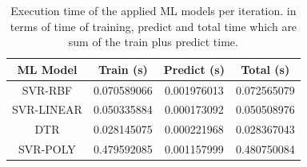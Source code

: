 \documentclass{bmcart}
\begin{document}
\begin{backmatter}
\begin{table}[h!]
\caption{Execution time of the applied ML models per iteration. in terms of time of training, predict and total time which are sum of the train plus predict time.}  \label{tab2}
\centering
\begin{tabular}{cccc}
\toprule
\textbf{ML Model} & \textbf{Train (s)} & \textbf{Predict (s)} & \textbf{Total (s)} \\
\midrule
SVR-RBF & 0.070589066 & 0.001976013 & 0.072565079 \\
SVR-LINEAR & 0.050335884 & 0.000173092 & 0.050508976 \\
DTR & 0.028145075 & 0.000221968 & 0.028367043 \\
SVR-POLY & 0.479592085 & 0.001157999 & 0.480750084 \\
\bottomrule
\end{tabular}
\end{table}




%
%

\end{backmatter}
\end{document}
